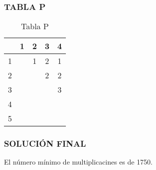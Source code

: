 \documentclass[10]{beamer}
\begin{document}
\begin{frame}\frametitle{TABLA P}
 \color{white}
\begin{table}
 \begin{tabular}{ c | c  | c  | c  | c }
 \\    & 1   & 2   & 3   & 4  \\ 
 \hline \hline 
  1  & & 1& 2& 1 \\ 
  2  &  & & 2& 2 \\ 
  3  &  &  & & 3 \\ 
  4  &  &  &  &  \\ 
  5  &  &  &  &  \\ 
  
 \end{tabular}
 \color{white}
\caption{Tabla P}
 \end{table}
 \end{frame} 
\begin{frame}
\color{white}
\frametitle{SOLUCI\'ON FINAL}
El n\'umero m\'inimo de multiplicacines es de 1750.
\end{frame} 
\end{document}

